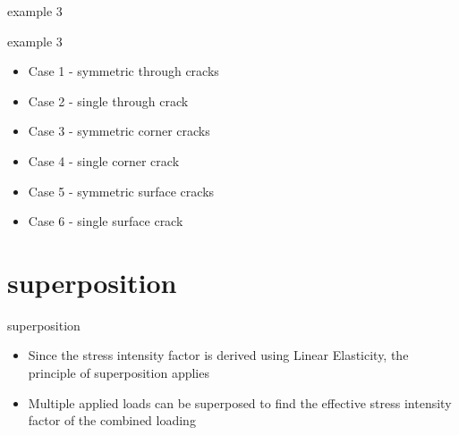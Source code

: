 \documentclass[10pt,handout]{beamer}
\begin{document}
\begin{frame}{example 3}
	\begin{figure}[H]
		\centering
		\label{fig:problem3}
	\end{figure}
\end{frame}

\begin{frame}{example 3}
	\begin{itemize}
		\item Case 1 - symmetric through cracks
		\item Case 2 - single through crack
		\item Case 3 - symmetric corner cracks
		\item Case 4 - single corner crack
		\item Case 5 - symmetric surface cracks
		\item Case 6 - single surface crack
	\end{itemize}
\end{frame}
\section{superposition}

\begin{frame}{superposition}
	\begin{itemize}
		\item Since the stress intensity factor is derived using Linear Elasticity, the principle of superposition applies
		\item Multiple applied loads can be superposed to find the effective stress intensity factor of the combined loading
	\end{itemize}
\end{frame}
\end{document}
